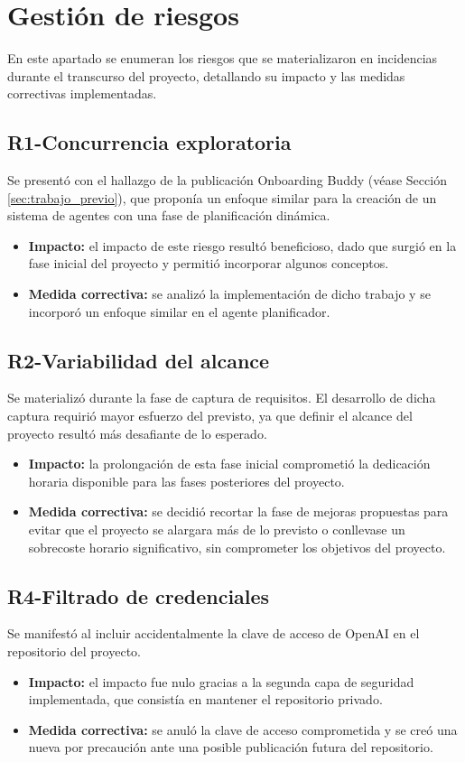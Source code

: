   \section{Gestión de riesgos}
  En este apartado se enumeran los riesgos que se materializaron en incidencias durante el transcurso del proyecto, detallando su impacto y las medidas correctivas implementadas.

  \subsection{R1-Concurrencia exploratoria}
  Se presentó con el hallazgo de la publicación Onboarding Buddy \cite{ionescu_multi-agent_2025} (véase Sección \ref{sec:trabajo_previo}), que proponía un enfoque similar para la creación de un sistema de agentes con una fase de planificación dinámica.
  \begin{itemize}
    \item\textbf{Impacto: }el impacto de este riesgo resultó beneficioso, dado que surgió en la fase inicial del proyecto y permitió incorporar algunos conceptos.
    \item\textbf{Medida correctiva: }se analizó la implementación de dicho trabajo y se incorporó un enfoque similar en el agente planificador.
  \end{itemize}

  \subsection{R2-Variabilidad del alcance}
Se materializó durante la fase de captura de requisitos. El desarrollo de dicha captura requirió mayor esfuerzo del previsto, ya que definir el alcance del proyecto resultó más desafiante de lo esperado.
  \begin{itemize}
  \item\textbf{Impacto: }la prolongación de esta fase inicial comprometió la dedicación horaria disponible para las fases posteriores del proyecto.
    \item\textbf{Medida correctiva: }se decidió recortar la fase de mejoras propuestas para evitar que el proyecto se alargara más de lo previsto o conllevase un sobrecoste horario significativo, sin comprometer los objetivos del proyecto.   
  \end{itemize}

  \subsection{R4-Filtrado de credenciales}
  Se manifestó al incluir accidentalmente la clave de acceso de OpenAI en el repositorio del proyecto.
  \begin{itemize}
  \item\textbf{Impacto: }el impacto fue nulo gracias a la segunda capa de seguridad implementada, que consistía en mantener el repositorio privado.
  \item\textbf{Medida correctiva: }se anuló la clave de acceso comprometida y se creó una nueva por precaución ante una posible publicación futura del repositorio.
  \end{itemize}
